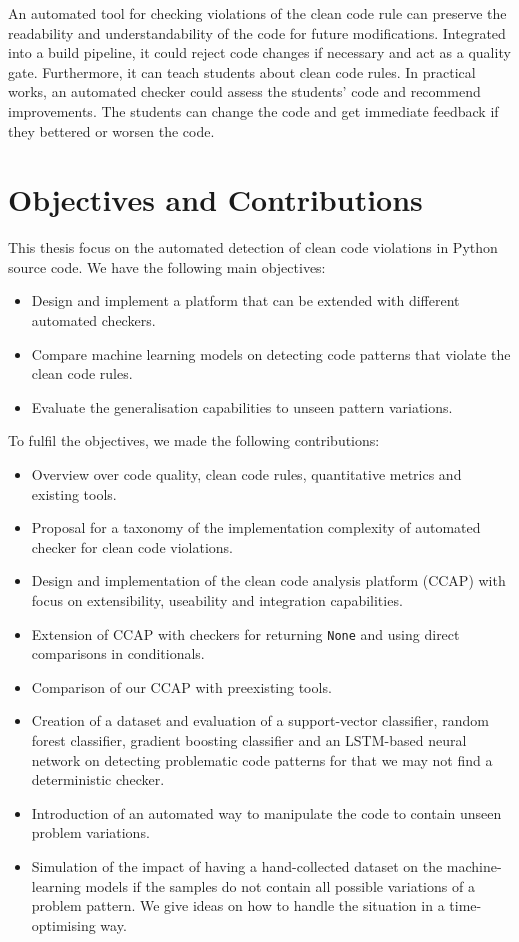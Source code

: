 An automated tool for checking violations of the clean code rule can preserve the readability and understandability of the code for future modifications. Integrated into a build pipeline, it could reject code changes if necessary and act as a quality gate.
Furthermore, it can teach students about clean code rules. In practical works, an automated checker could assess the students' code and recommend improvements. The students can change the code and get immediate feedback if they bettered or worsen the code.


\section{Objectives and Contributions}
This thesis focus on the automated detection of clean code violations in Python source code. 
We have the following main objectives:
\begin{itemize}
    \item Design and implement a platform that can be extended with different automated checkers.
    \item Compare machine learning models on detecting code patterns that violate the clean code rules.
    \item Evaluate the generalisation capabilities to unseen pattern variations.  
\end{itemize}

To fulfil the objectives, we made the following contributions:
\begin{itemize}
    \item Overview over code quality, clean code rules, quantitative metrics and existing tools.
    \item Proposal for a taxonomy of the implementation complexity of automated checker for clean code violations.
    \item Design and implementation of the clean code analysis platform (CCAP) with focus on extensibility, useability and integration capabilities.
    \item Extension of CCAP with checkers for returning \texttt{None} and using direct comparisons in conditionals.
    \item Comparison of our CCAP with preexisting tools.
    \item Creation of a dataset and evaluation of a support-vector classifier, random forest classifier, gradient boosting classifier and an LSTM-based neural network on detecting problematic code patterns for that we may not find a deterministic checker.
    \item Introduction of an automated way to manipulate the code to contain unseen problem variations.
    \item Simulation of the impact of having a hand-collected dataset on the machine-learning models if the samples do not contain all possible variations of a problem pattern. We give ideas on how to handle the situation in a time-optimising way.
\end{itemize}

